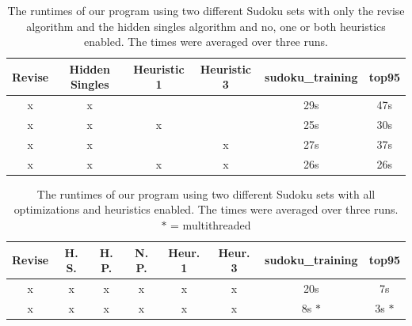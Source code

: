 \documentclass[11pt]{article} %
\begin{document}
\begin{table}[hp]
\begin{center}
\begin{tabular}{c c c c c c}
\hline
 Revise & Hidden Singles & Heuristic 1 & Heuristic 3 & sudoku\_training & top95 \\
\hline
x & x &  &  & 29s & 47s \\ %
x & x & x &  & 25s & 30s \\ %
x & x &  & x & 27s & 37s \\ %
x & x & x & x & 26s & 26s \\ %
\hline
\end{tabular}
\end{center}
\caption{The runtimes of our program using two different Sudoku sets with only the revise algorithm and the hidden singles algorithm and no, one or both heuristics enabled. The times were averaged over three runs.}
\label{tab:hs+heur_results}
\end{table}

\begin{table}[hp]
\begin{center}
\begin{tabular}{c c c c c c c c}
\hline
 Revise & H. S. & H. P. & N. P. & Heur. 1 & Heur. 3 & sudoku\_training & top95 \\
\hline
x & x & x & x & x & x & 20s & 7s \\ 
x & x & x & x & x & x & 8s $*$ & 3s $*$ \\
\hline
\end{tabular}
\end{center}
\caption{The runtimes of our program using two different Sudoku sets with all optimizations and heuristics enabled. The times were averaged over three runs. \\ $*$ = multithreaded}
\label{tab:alles_aan}
\end{table}
\end{document}
